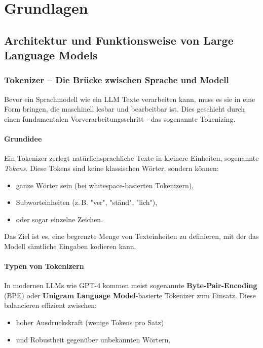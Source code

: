 \chapter{Grundlagen}

\section{Architektur und Funktionsweise von Large Language Models}
\subsection{Tokenizer – Die Brücke zwischen Sprache und Modell}

Bevor ein Sprachmodell wie ein LLM Texte verarbeiten kann, muss es sie in eine Form bringen, die maschinell lesbar und bearbeitbar ist. Dies geschieht durch einen fundamentalen Vorverarbeitungsschritt - das sogenannte Tokenizing.

\subsubsection{Grundidee}
Ein Tokenizer zerlegt natürlichsprachliche Texte in kleinere Einheiten, sogenannte \textit{Tokens}. Diese Tokens sind keine klassischen Wörter, sondern können:
\begin{itemize}
  \item ganze Wörter sein (bei whitespace-basierten Tokenizern),
  \item Subworteinheiten (z. B. "ver", "ständ", "lich"),
  \item oder sogar einzelne Zeichen.
\end{itemize}
Das Ziel ist es, eine begrenzte Menge von Texteinheiten zu definieren, mit der das Modell sämtliche Eingaben kodieren kann.

\subsubsection{Typen von Tokenizern}
In modernen LLMs wie GPT-4 kommen meist sogenannte \textbf{Byte-Pair-Encoding} (BPE) oder \textbf{Unigram Language Model}-basierte Tokenizer zum Einsatz. Diese balancieren effizient zwischen:
\begin{itemize}
  \item hoher Ausdruckskraft (wenige Tokens pro Satz)
  \item und Robustheit gegenüber unbekannten Wörtern.
\end{itemize}

